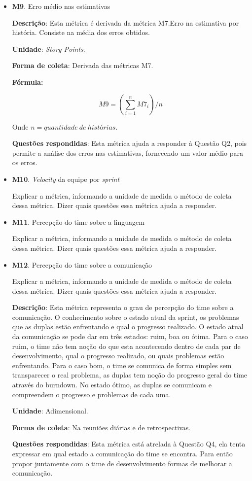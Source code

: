 \begin{itemize}
	 \item \textbf{M9}. Erro médio nas estimativas

	   \subitem \textbf{Descrição}: Esta métrica é derivada da métrica M7.Erro na estimativa por história.
		    Consiste na média dos erros obtidos.

	   \subitem \textbf{Unidade}: \textit{Story Points}.

	   \subitem \textbf{Forma de coleta}: Derivada das métricas M7.

	      \subsubitem \textbf{Fórmula:}

		$$ M9 = (\sum\limits_{i=1}^{n}M7_i)/n $$

	      \subsubitem Onde $n = quantidade\ de\ histórias$.

	   \subitem \textbf{Questões respondidas}: Esta métrica ajuda a responder à Questão Q2, pois permite a análise
		    dos erros nas estimativas, fornecendo um valor médio para os erros.

	 \item \textbf{M10}. \textit{Velocity} da equipe por \textit{sprint}

	   \subitem Explicar a métrica, informando a unidade de medida o método de coleta dessa métrica. Dizer quais questões essa
		    métrica ajuda a responder.

	 \item \textbf{M11}. Percepção do time sobre a linguagem

	   \subitem Explicar a métrica, informando a unidade de medida o método de coleta dessa métrica. Dizer quais questões essa
		    métrica ajuda a responder.

	 \item \textbf{M12}. Percepção do time sobre a comunicação

	   \subitem Explicar a métrica, informando a unidade de medida o método de coleta dessa métrica. Dizer quais questões essa
		    métrica ajuda a responder.

	    \subitem \textbf{Descrição}: Esta métrica representa o grau de percepção do time sobre a comunicação. O conhecimento sobre o estado atual da sprint, os problemas que as duplas estão enfrentando e qual o progresso realizado. O estado atual da comunicação se pode dar em três estados: ruim, boa ou ótima. Para o caso ruim, o time não tem noção do que esta acontecendo dentro de cada par de desenvolvimento, qual o progresso realizado, ou quais problemas estão enfrentando. Para o caso bom, o time se comunica de forma simples sem transparecer o real problema, as duplas tem noção do progresso geral do time através do burndown. No estado ótimo, as duplas se comunicam e compreendem o progresso e problemas de cada uma.

	   \subitem \textbf{Unidade}: Adimensional.

	   \subitem \textbf{Forma de coleta}: Na reuniões diárias e de retrospectivas.

	   \subitem \textbf{Questões respondidas}: Esta métrica está atrelada à Questão Q4, ela tenta expressar em qual estado a comunicação do time se encontra. Para então propor juntamente com o time de desenvolvimento formas de melhorar a comunicação.

	\end{itemize}
